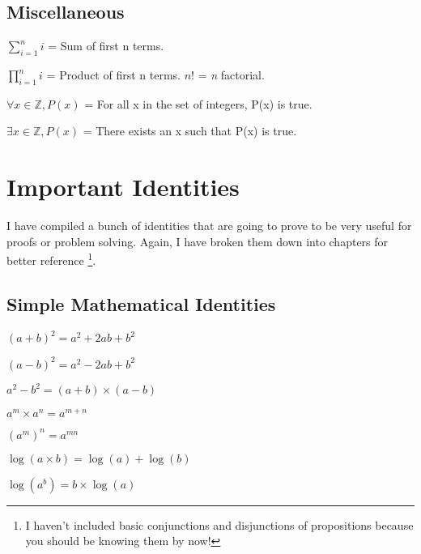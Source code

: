 \subsection{Miscellaneous}
\begin{symbollist}
    \item[$\sum_{i = 1} ^ {n} i$] = Sum of first n terms.
    \item[$\prod_{i = 1} ^ {n} i$] = Product of first n terms.  $n!$ = \emph{n}
        factorial.
    \item[$\forall x \in \mathbb{Z}, P(x)$] = For all x in the set of integers,
        P(x) is true.
    \item[$\exists x \in \mathbb{Z}, P(x)$] = There exists an x such that P(x)
        is true.
\end{symbollist}

\pagebreak[4]

\section{Important Identities}
\indent \indent I have compiled a bunch of identities that are going to prove
to be very useful for proofs or problem solving. Again, I have broken them down
into chapters for better reference \footnote{I haven't included basic
conjunctions and disjunctions of propositions because you should be knowing
them by now!}.

\subsection{Simple Mathematical Identities}
\begin{symbollist}
    \item $(a + b)^{2} = a^{2} + 2ab + b^{2}$
    \item $(a - b)^{2} = a^{2} - 2ab + b^{2}$
    \item $a^{2} - b^{2} = (a + b)\times(a - b)$
    \item $a^{m} \times a^{n} = a^{m + n}$
    \item $(a^{m})^{n} = a^{mn}$
    \item $\log(a \times b) = \log(a) + \log(b)$
    \item $\log(a^{b}) = b \times \log(a)$
\end{symbollist}

